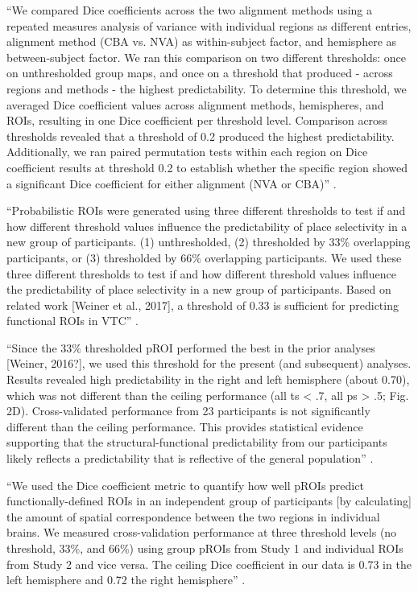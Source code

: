 %
``We compared Dice coefficients across the two alignment methods using a
repeated measures analysis of variance with individual regions as different
entries, alignment method (CBA vs. NVA) as within-subject factor, and hemisphere
as between-subject factor.
%
We ran this comparison on two different thresholds:
%
once on unthresholded group maps, and once on a threshold that produced - across
regions and methods - the highest predictability.
%
To determine this threshold, we averaged Dice coefficient values across
alignment methods, hemispheres, and ROIs, resulting in one Dice coefficient per
threshold level.
%
Comparison across thresholds revealed that a threshold of 0.2 produced the
highest predictability.
%
Additionally, we ran paired permutation tests within each region on Dice
coefficient results at threshold 0.2 to establish whether the specific region
showed a significant Dice coefficient for either alignment (NVA or CBA)''
\citep{rosenke2021probabilistic}.



%
``Probabilistic ROIs were generated using three different thresholds to test if
and how different threshold values influence the predictability of place
selectivity in a new group of participants.
%
(1) unthresholded,
%
(2) thresholded by 33\% overlapping participants, or
%
(3) thresholded by 66\% overlapping participants.
%
We used these three different thresholds to test if and how different threshold
values influence the predictability of place selectivity in a new group of
participants. Based on related work [Weiner et al., 2017], a threshold of 0.33
is sufficient for predicting functional ROIs in VTC''
\citep{weiner2018defining}.

%
``Since the 33\% thresholded pROI performed the best in the prior analyses
[Weiner, 2016?], we used this threshold for the present (and subsequent)
analyses.
%
Results revealed high predictability in the right and left hemisphere (about
0.70), which was not different than the ceiling performance (all ts < .7, all ps
> .5; Fig. 2D).
%
Cross-validated performance from 23 participants is not significantly different
than the ceiling performance.
%
This provides statistical evidence supporting that the structural-functional
predictability from our participants likely reflects a predictability that is
reflective of the general population'' \citep{weiner2018defining}.

%
``We used the Dice coefficient metric to quantify how well pROIs predict
functionally-defined ROIs in an independent group of participants [by
calculating] the amount of spatial correspondence between the two regions in
individual brains.
%
We measured cross-validation performance at three threshold levels (no
threshold, 33\%, and 66\%) using group pROIs from Study 1 and individual ROIs
from Study 2 and vice versa.
%
The ceiling Dice coefficient in our data is 0.73 in the left hemisphere and 0.72
the right hemisphere'' \citep{weiner2018defining}.

